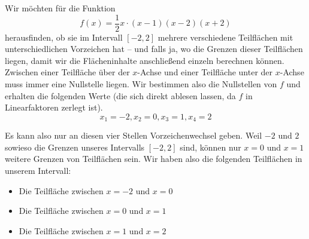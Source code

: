 \documentclass[../../main.tex]{subfiles}
\begin{document}
\begin{example}{}
    Wir möchten für die Funktion\[f(x)=\frac{1}{2}x\cdot (x-1)(x-2)(x+2)\] herausfinden, ob sie im Intervall $[-2,2]$
    mehrere verschiedene Teilflächen mit unterschiedlichen Vorzeichen hat -- und falls ja, wo die Grenzen dieser
    Teilflächen liegen, damit wir die Flächeninhalte anschließend einzeln berechnen können. 
    Zwischen einer Teilfläche über der $x$-Achse und einer Teilfläche unter der $x$-Achse
    muss immer eine Nullstelle liegen. Wir bestimmen also die Nullstellen von $f$ und erhalten die folgenden Werte
    (die sich direkt ablesen lassen, da $f$ in Linearfaktoren zerlegt ist).
    \[x_1=-2,x_2=0,x_3=1,x_4=2\]

    Es kann also nur an diesen vier Stellen Vorzeichenwechsel geben. Weil $-2$ und $2$ sowieso die Grenzen unseres
    Intervalls $[-2,2]$ sind, können nur $x=0$ und $x=1$ weitere Grenzen von Teilflächen sein. Wir haben also die
    folgenden Teilflächen in unserem Intervall:
    \begin{itemize}
        \item Die Teilfläche zwischen $x=-2$ und $x=0$
        \item Die Teilfläche zwischen $x=0$ und $x=1$
        \item Die Teilfläche zwischen $x=1$ und $x=2$
    \end{itemize}
\end{example}
\end{document}
